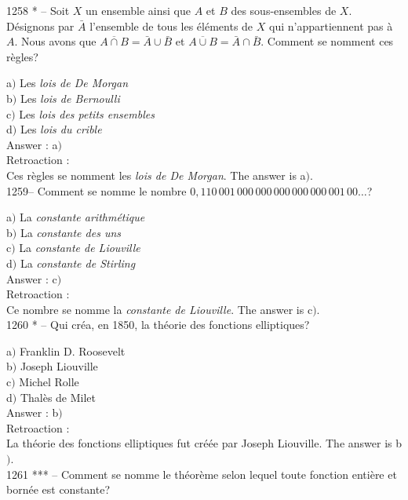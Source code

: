 ﻿\documentclass[letterpaper, 12pt]{article}
\begin{document}
1258 * -- Soit $X$ un ensemble ainsi que $A$ et $B$ des
sous-ensembles de $X$. D\'esignons par $\bar A$ l'ensemble de tous
les \'el\'ements de $X$ qui n'appartiennent pas \`a $A$. Nous avons
que $\overline{A\cap B}=\bar A\cup\bar B$ et $\overline{A\cup
B}=\bar A\cap\bar B$. Comment se nomment ces r\`egles?

a$)$ Les {\sl lois de De Morgan} \\
b$)$ Les {\sl lois de Bernoulli} \\
c$)$ Les {\sl lois des petits ensembles} \\
d$)$ Les {\sl lois du crible}\\

Answer : a$)$\\

Retroaction : \\
Ces r\`egles se nomment les {\sl lois de De Morgan}.
The answer is a$)$.\\

1259-- Comment se nomme le nombre
$0,110\,001\,000\,000\,000\,000\,000\,001\,00\ldots$?

a$)$ La {\sl constante arithm\'etique} \\
b$)$ La {\sl constante des uns} \\
c$)$ La {\sl constante de Liouville} \\
d$)$ La {\sl constante de Stirling}\\

Answer : c$)$\\

Retroaction : \\
Ce nombre se nomme la {\sl constante de Liouville}.
The answer is c$)$.\\

1260 * -- Qui cr\'ea, en 1850, la th\'eorie des fonctions
elliptiques?

a$)$ Franklin D. Roosevelt \\
b$)$ Joseph Liouville \\
c$)$ Michel Rolle \\
d$)$ Thal\`es de Milet\\

Answer : b$)$\\

Retroaction : \\
La th\'eorie des fonctions elliptiques fut cr\'e\'ee par Joseph
Liouville.
The answer is b$)$.\\

1261 *** -- Comment se nomme le th\'eor\`eme selon lequel toute
fonction enti\`ere et born\'ee est constante?
\end{document}
